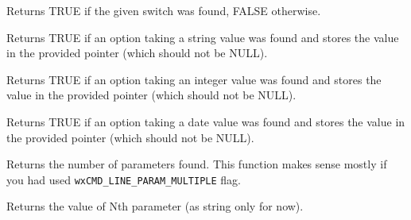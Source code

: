 \label{wxcmdlineparserfoundswitch}


Returns TRUE if the given switch was found, FALSE otherwise.

\label{wxcmdlineparserfoundstringoption}


Returns TRUE if an option taking a string value was found and stores the
value in the provided pointer (which should not be NULL).

\label{wxcmdlineparserfoundintoption}


Returns TRUE if an option taking an integer value was found and stores
the value in the provided pointer (which should not be NULL).

\label{wxcmdlineparserfounddateoption}


Returns TRUE if an option taking a date value was found and stores the
value in the provided pointer (which should not be NULL).

\label{wxcmdlineparsergetparamcount}


Returns the number of parameters found. This function makes sense mostly if you
had used {\tt wxCMD\_LINE\_PARAM\_MULTIPLE} flag.

\label{wxcmdlineparsergetparam}


Returns the value of Nth parameter (as string only for now).



